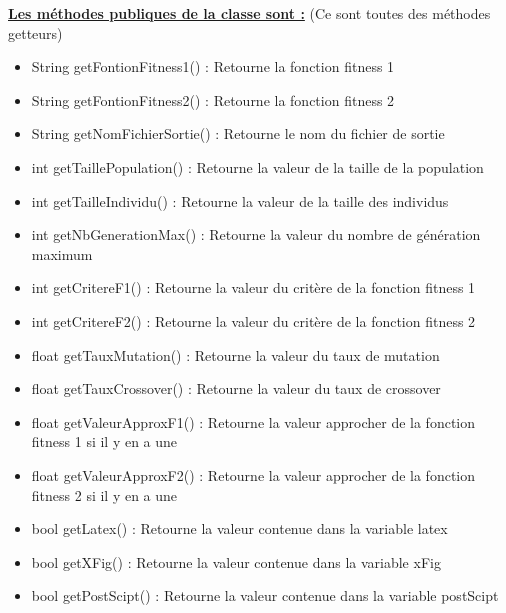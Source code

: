 \documentclass[a4paper,11pt]{article}
\begin{document}
			\underline{\bf Les méthodes publiques de la classe sont :} (Ce sont toutes des méthodes getteurs)\\
			\begin{itemize}
				\item String getFontionFitness1() : Retourne la fonction fitness 1
				\item String getFontionFitness2() : Retourne la fonction fitness 2
				\item String getNomFichierSortie() : Retourne le nom du fichier de sortie
				\item int getTaillePopulation() : Retourne la valeur de la taille de la population
				\item int getTailleIndividu() : Retourne la valeur de la taille des individus
				\item int getNbGenerationMax() : Retourne la valeur du nombre de génération maximum
				\item int getCritereF1() : Retourne la valeur du critère de la fonction fitness 1
				\item int getCritereF2() : Retourne la valeur du critère de la fonction fitness 2
				\item float getTauxMutation() : Retourne la valeur du taux de mutation
				\item float getTauxCrossover() : Retourne la valeur du taux de crossover
				\item float getValeurApproxF1() : Retourne la valeur approcher de la fonction fitness 1 si il y en a une
				\item float getValeurApproxF2() : Retourne la valeur approcher de la fonction fitness 2 si il y en a une
				\item bool getLatex() : Retourne la valeur contenue dans la variable latex
				\item bool getXFig() : Retourne la valeur contenue dans la variable  xFig
				\item bool getPostScipt() : Retourne la valeur contenue dans la variable  postScipt\\
			\end{itemize}
		
		
\end{document}
